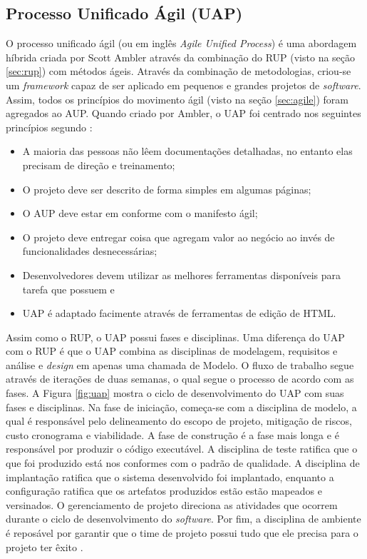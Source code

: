 \subsection{Processo Unificado Ágil (UAP)}

O processo unificado ágil (ou em inglês \textit{Agile Unified Process}) é uma abordagem híbrida criada por Scott Ambler através da combinação do RUP (visto na seção \ref{sec:rup}) com métodos ágeis. Através da combinação de metodologias, criou-se um \textit{framework} capaz de ser aplicado em pequenos e grandes projetos de \textit{software}. Assim, todos os princípios do movimento ágil (visto na seção \ref{sec:agile}) foram agregados ao AUP.
Quando criado por Ambler, o UAP foi centrado nos seguintes princípios segundo :

\begin{itemize}
	\item A maioria das pessoas não lêem documentações detalhadas, no entanto elas precisam de direção e treinamento;
	\item O projeto deve ser descrito de forma simples em algumas páginas;
	\item O AUP deve estar em conforme com o manifesto ágil;
	\item O projeto deve entregar coisa que agregam valor ao negócio ao invés de funcionalidades desnecessárias;
	\item Desenvolvedores devem utilizar as melhores ferramentas disponíveis para tarefa que possuem e
	\item UAP é adaptado facimente através de ferramentas de edição de HTML.
\end{itemize}

Assim como o RUP, o UAP possui fases e disciplinas. Uma diferença do UAP com o RUP é que o UAP combina as disciplinas de modelagem, requisitos e análise e \textit{design} em apenas uma chamada de Modelo. O fluxo de trabalho segue através de iterações de duas semanas, o qual segue o processo de acordo com as fases. A Figura \ref{fig:uap} mostra o ciclo de desenvolvimento do UAP com suas fases e disciplinas. Na fase de iniciação, começa-se com a disciplina de modelo, a qual é responsável pelo delineamento do escopo de projeto, mitigação de riscos, custo cronograma e viabilidade. A fase de construção é a fase mais longa e é responsável por produzir o código executável. A disciplina de teste ratifica que o que foi produzido está nos conformes com o padrão de qualidade. A disciplina de implantação ratifica que o sistema desenvolvido foi implantado, enquanto a configuração ratifica que os artefatos produzidos estão estão mapeados e versinados. O gerenciamento de projeto direciona as atividades que ocorrem durante o ciclo de desenvolvimento do \textit{software}. Por fim, a disciplina de ambiente é reposável por garantir que o time de projeto possui tudo que ele precisa para o projeto ter êxito \cite{edeki:13}. 

